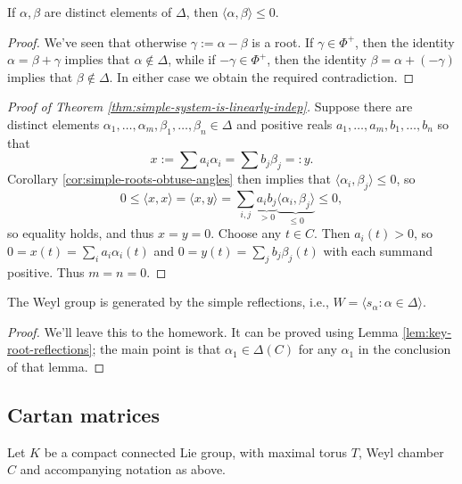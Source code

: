 \documentclass[reqno]{amsart} 
\begin{document}
\begin{corollary}\label{cor:simple-roots-obtuse-angles}
  If $\alpha, \beta$ are distinct elements of $\Delta$, then $\langle \alpha, \beta \rangle \leq 0$.
\end{corollary}
\begin{proof}
  We've seen that otherwise $\gamma := \alpha - \beta$ is a root.  If $\gamma \in \Phi^+$, then the identity $\alpha = \beta + \gamma$ implies that $\alpha \notin \Delta$, while if $-\gamma \in \Phi^+$, then the identity $\beta = \alpha + (-\gamma)$ implies that $\beta \notin \Delta$.  In either case we obtain the required contradiction.
\end{proof}

\begin{proof}
[Proof of Theorem \ref{thm:simple-system-is-linearly-indep}]
  Suppose there are distinct elements $\alpha_1,\dotsc,\alpha_m, \beta_1, \dotsc, \beta_n \in \Delta$ and positive reals $a_1,\dotsc,a_m,b_1,\dotsc,b_n$ so that
  \begin{equation*}
    x := \sum a_i \alpha_i = \sum b_j \beta_j =: y.
  \end{equation*}
  Corollary \ref{cor:simple-roots-obtuse-angles} then implies that $\langle \alpha_i, \beta_j \rangle \leq 0$, so
  \begin{equation*}
    0 \leq \langle x, x \rangle = \langle x, y \rangle = \sum_{i,j} \underbrace{a_i b_j}_{>0} \underbrace{\langle \alpha_i, \beta_j \rangle}_{\leq 0} \leq 0,
  \end{equation*}
  so equality holds, and thus $x = y = 0$.  Choose any $t \in C$.  Then $a_i(t) > 0$, so $0 = x(t) = \sum_{i} a_i \alpha_i(t)$ and $0 = y(t) = \sum_{j} b_j \beta_j(t)$ with each summand positive.  Thus $m = n = 0$.
\end{proof}

\begin{theorem}
  The Weyl group is generated by the simple reflections, i.e., $W = \langle s_\alpha : \alpha \in \Delta \rangle$.
\end{theorem}
\begin{proof}
  We'll leave this to the homework.  It can be proved using Lemma \ref{lem:key-root-reflections}; the main point is that $\alpha_1 \in \Delta(C)$ for any $\alpha_1$ in the conclusion of that lemma.
\end{proof}


\subsection{Cartan matrices}
Let $K$ be a compact connected Lie group, with maximal torus $T$, Weyl chamber $C$ and accompanying notation as above.
\end{document}
